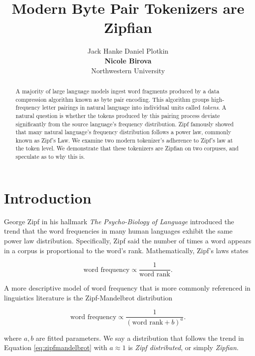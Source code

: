 \documentclass[11pt]{article}
\title{Modern Byte Pair Tokenizers are Zipfian}
\author{Jack Hanke \qquad Daniel Plotkin \\ 
        {\bf Nicole Birova} \qquad {\bf David Demeter} \\
        Northwestern University }
\begin{document}
\maketitle
\begin{abstract}
A majority of large language models ingest word fragments produced by a data compression algorithm known as byte pair encoding. This algorithm groups high-frequency letter pairings in natural language into individual units called  \textit{tokens}. A natural question is whether the tokens produced by this pairing process deviate significantly from the source language's frequency distribution. Zipf famously showed that many natural language's frequency distribution follows a power law, commonly known as Zipf's Law. We examine two modern tokenizer's adherence to Zipf's law at the token level. We demonstrate that these tokenizers are Zipfian on two corpuses, and speculate as to why this is.
\end{abstract}

\section{Introduction}
\label{section:intro}

George Zipf in his hallmark \textit{The Psycho-Biology of Language} \cite{Zip35} introduced the trend that the word frequencies in many human languages exhibit the same power law distribution. Specifically, Zipf said the number of times a word appears in a corpus is proportional to the word's rank. Mathematically, Zipf's laws states

\begin{equation}
    \mbox{word frequency} \propto \frac{1}{\mbox{word rank}}.
\end{equation}

A more descriptive model of word frequency that is more commonly referenced in linguistics literature is the Zipf-Mandelbrot distribution

\begin{equation}
    \mbox{word frequency} \propto \frac{1}{(\mbox{word rank} + b)^a}.
    \label{eq:zipfmandelbrot}
\end{equation}

where $a,b$ are fitted parameters. We say a distribution that follows the trend in Equation \ref{eq:zipfmandelbrot} with $a \approx 1$ is \textit{Zipf distributed}, or simply \textit{Zipfian}.
\end{document}
